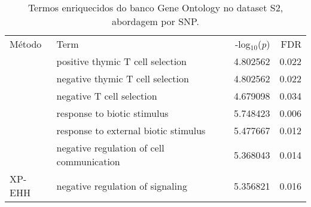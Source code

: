 \begin{table}[H]
\centering

\begin{tabular}[!htbp]{llrr}
\toprule
Método & Term & -log$_{10}$(\emph{p}) & FDR\\
\rowcolor{gray!6}
\midrule
 & positive thymic T cell selection & 4.802562 & 0.022\\
\rowcolor{gray!6}

 & negative thymic T cell selection & 4.802562 & 0.022\\
\rowcolor{gray!6}

\multirow{-3}{*}{\raggedright\arraybackslash PBS} & negative T cell selection & 4.679098 & 0.034\\
\cmidrule{1-4}
 & response to biotic stimulus & 5.748423 & 0.006\\

 & response to external biotic stimulus & 5.477667 & 0.012\\

 & negative regulation of cell communication & 5.368043 & 0.014\\

\multirow{-4}{*}{\raggedright\arraybackslash XP-EHH} & negative regulation of signaling & 5.356821 & 0.016\\
\bottomrule
\end{tabular}

\caption{Termos enriquecidos do banco Gene Ontology no dataset S2, abordagem por SNP.}
\label{tab:ds2_go_immune_persnp}

\end{table}
